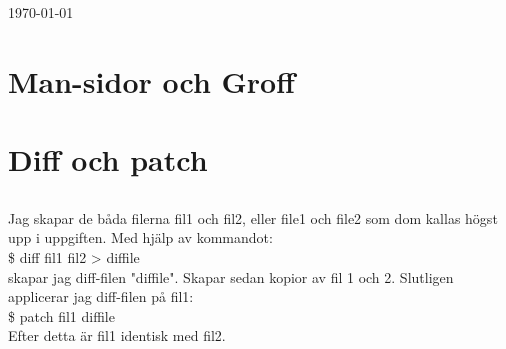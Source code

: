 \documentclass[11pt]{article}
\begin{document}
\begin{titlepage}


	\vfill\vfill\vfill %

	{\large\today} %




	\vfill %

\end{titlepage}


\section{Man-sidor och Groff}

\section{Diff och patch}

\subsection{  }
Jag skapar de båda filerna fil1 och fil2, eller file1 och file2 som dom kallas högst upp i uppgiften. Med hjälp av kommandot:\\ 
\$ diff fil1 fil2 > diffile\\
skapar jag diff-filen "diffile". Skapar sedan kopior av fil 1 och 2. Slutligen applicerar jag diff-filen på fil1: \\
\$ patch fil1 diffile\\
Efter detta är fil1 identisk med fil2. 
\end{document}
